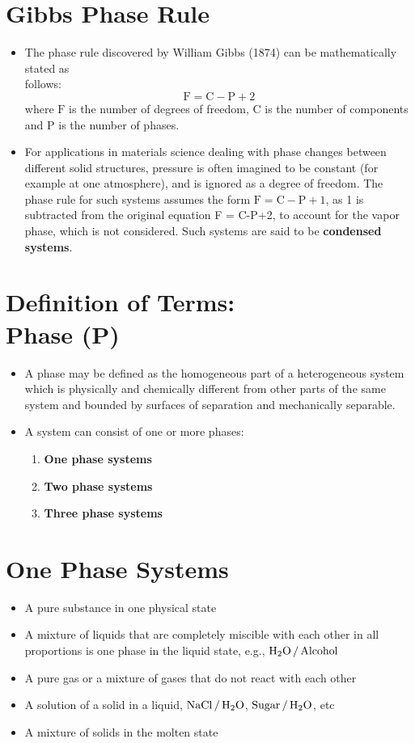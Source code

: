 \documentclass[a4paper,12pt,twocolumn]{article}
\begin{document}
\section{Gibbs Phase Rule}
\begin{itemize}
\item The phase rule discovered by William Gibbs (1874) can be mathematically stated as \\follows: $$\mathrm{F = C - P + 2}$$
where $\mathrm{F}$ is the number of degrees of freedom, $\mathrm{C}$ is the number of components and $\mathrm{P}$ is the number of phases.
\item For applications in materials science dealing with phase changes between different solid structures, pressure is often imagined to be constant (for example at one atmosphere), and is ignored as a degree of freedom. The phase rule for such systems assumes the form $\mathrm{F = C - P + 1}$, as 1 is subtracted from the original equation F = C-P+2, to account for the vapor phase, which is not considered. Such systems are said to be \textbf{condensed systems}. 
\end{itemize}

\section{Definition of Terms:\\ Phase (P)}
\begin{itemize}
\item A phase may be defined as the homogeneous part of a heterogeneous system which is physically and chemically  different from other parts of the same system and bounded by surfaces of separation and mechanically separable.
\item A system can consist of one or more phases:
    \begin{enumerate}
    \item \textbf{One phase systems}
    \item \textbf{Two phase systems}
    \item \textbf{Three phase systems}
    \end{enumerate} 
\end{itemize}

\section{One Phase Systems}
\begin{itemize}
\item A pure substance in one physical state 
\item A mixture of liquids that are completely miscible with each other in all proportions is one phase in the liquid state, e.g., $\ce{H2O / Alcohol}$ 
\item A pure gas or a mixture of gases that do not react with each other 
\item A solution of a solid in a liquid, $\ce{NaCl / H2O}$, $\ce{Sugar / H2O}$, etc 
\item A mixture of solids in the molten state 
\end{itemize}
\end{document}
